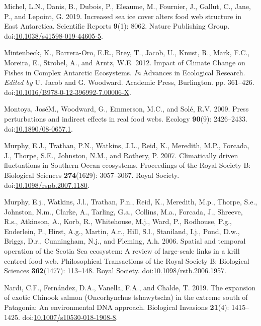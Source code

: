 \documentclass[
]{article}
\newlength{\cslhangindent}
\newenvironment{CSLReferences}[2] %
 {\begin{list}{}{%
  \setlength{\itemindent}{0pt}
  \setlength{\leftmargin}{0pt}
  \setlength{\parsep}{0pt}
  \ifodd #1
   \setlength{\leftmargin}{\cslhangindent}
   \setlength{\itemindent}{-1\cslhangindent}
  \fi
  \setlength{\itemsep}{#2\baselineskip}}}
 {\end{list}}
\begin{document}
\begin{CSLReferences}{1}{0}
Michel, L.N., Danis, B., Dubois, P., Eleaume, M., Fournier, J., Gallut,
C., Jane, P., and Lepoint, G. 2019. Increased sea ice cover alters food
web structure in {East Antarctica}. Scientific Reports \textbf{9}(1):
8062. Nature Publishing Group.
doi:\href{https://doi.org/10.1038/s41598-019-44605-5}{10.1038/s41598-019-44605-5}.

Mintenbeck, K., Barrera-Oro, E.R., Brey, T., Jacob, U., Knust, R., Mark,
F.C., Moreira, E., Strobel, A., and Arntz, W.E. 2012. Impact of {Climate
Change} on {Fishes} in {Complex Antarctic Ecosystems}. \emph{In}
Advances in {Ecological Research}. \emph{Edited by} U. Jacob and G.
Woodward. Academic Press, Burlington. pp. 361--426.
doi:\href{https://doi.org/10.1016/B978-0-12-396992-7.00006-X}{10.1016/B978-0-12-396992-7.00006-X}.

Montoya, JoséM., Woodward, G., Emmerson, M.C., and Solé, R.V. 2009.
Press perturbations and indirect effects in real food webs. Ecology
\textbf{90}(9): 2426--2433.
doi:\href{https://doi.org/10.1890/08-0657.1}{10.1890/08-0657.1}.

Murphy, E.J., Trathan, P.N., Watkins, J.L., Reid, K., Meredith, M.P.,
Forcada, J., Thorpe, S.E., Johnston, N.M., and Rothery, P. 2007.
Climatically driven fluctuations in {Southern Ocean} ecosystems.
Proceedings of the Royal Society B: Biological Sciences
\textbf{274}(1629): 3057--3067. Royal Society.
doi:\href{https://doi.org/10.1098/rspb.2007.1180}{10.1098/rspb.2007.1180}.

Murphy, E.j., Watkins, J.l., Trathan, P.n., Reid, K., Meredith, M.p.,
Thorpe, S.e., Johnston, N.m., Clarke, A., Tarling, G.a., Collins, M.a.,
Forcada, J., Shreeve, R.s., Atkinson, A., Korb, R., Whitehouse, M.j.,
Ward, P., Rodhouse, P.g., Enderlein, P., Hirst, A.g., Martin, A.r.,
Hill, S.l., Staniland, I.j., Pond, D.w., Briggs, D.r., Cunningham, N.j.,
and Fleming, A.h. 2006. Spatial and temporal operation of the {Scotia
Sea} ecosystem: A review of large-scale links in a krill centred food
web. Philosophical Transactions of the Royal Society B: Biological
Sciences \textbf{362}(1477): 113--148. Royal Society.
doi:\href{https://doi.org/10.1098/rstb.2006.1957}{10.1098/rstb.2006.1957}.

Nardi, C.F., Fernández, D.A., Vanella, F.A., and Chalde, T. 2019. The
expansion of exotic {Chinook} salmon ({Oncorhynchus} tshawytscha) in the
extreme south of {Patagonia}: An environmental {DNA} approach.
Biological Invasions \textbf{21}(4): 1415--1425.
doi:\href{https://doi.org/10.1007/s10530-018-1908-8}{10.1007/s10530-018-1908-8}.


\end{CSLReferences}
\end{document}
